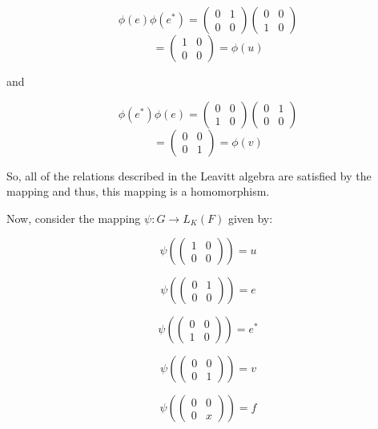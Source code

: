 \begin{solution}
    $$\phi(e)\phi(e^*)=\left(\begin{array}{cc} 0 & 1 \\ 0 & 0 \end{array}\right)
    \left(\begin{array}{cc} 0 & 0 \\ 1 & 0 \end{array}\right)$$
    $$=\left(\begin{array}{cc} 1 & 0 \\ 0 & 0 \end{array}\right)=\phi(u)$$

    and

    $$\phi(e^*)\phi(e)=\left(\begin{array}{cc} 0 & 0 \\ 1 & 0 \end{array}\right)
    \left(\begin{array}{cc} 0 & 1 \\ 0 & 0 \end{array}\right)$$
    $$=\left(\begin{array}{cc} 0 & 0 \\ 0 & 1 \end{array}\right)=\phi(v)$$

    So, all of the relations described in the Leavitt algebra are satisfied by the mapping and thus,
    this mapping is a homomorphism.

    Now, consider the mapping $\psi:G\rightarrow L_K(F)$ given by:

    $$\psi(\left(\begin{array}{cc} 1 & 0 \\ 0 & 0 \end{array}\right))=u$$

    $$\psi(\left(\begin{array}{cc} 0 & 1 \\ 0 & 0 \end{array}\right))=e$$

    $$\psi(\left(\begin{array}{cc} 0 & 0 \\ 1 & 0 \end{array}\right))=e^*$$

    $$\psi(\left(\begin{array}{cc} 0 & 0 \\ 0 & 1 \end{array}\right))=v$$

    $$\psi(\left(\begin{array}{cc} 0 & 0 \\ 0 & x \end{array}\right))=f$$


\end{solution}
